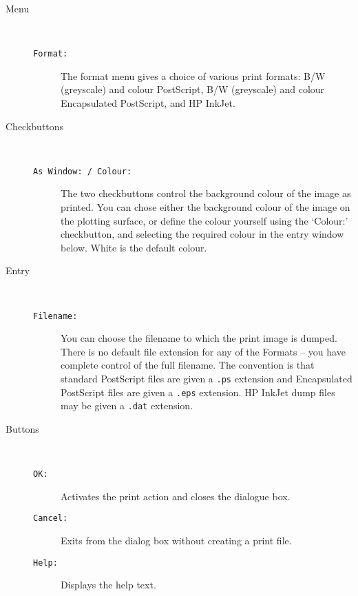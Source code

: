 \begin{description}

\item[Menu]~

\begin{description}

\item[{\tt{Format:}}] The format menu gives a choice of various print
formats: B/W (greyscale) and colour PostScript,  B/W (greyscale) and colour
Encapsulated PostScript, and HP InkJet.

\end{description}

\item[Checkbuttons]~

\begin{description}

\item[{\tt{As Window: / Colour:}}] The two checkbuttons control the
background colour of the image as printed.  You can chose either the
background colour of the image on the plotting surface, or define the
colour yourself using the `Colour:' checkbutton, and selecting the
required colour in the entry window below.  White is the default
colour.

\end{description}

\item[Entry]~

\begin{description}

\item[{\tt{Filename:}}] You can choose the filename to which the print
image is dumped.  There is no default file extension for any of the
Formats -- you have complete control of the full filename.  The
convention is that standard PostScript files are given a {\tt{.ps}}
extension and Encapsulated PostScript files are given a {\tt{.eps}}
extension.  HP InkJet dump files may be given a {\tt{.dat}} extension.

\end{description}

\item[Buttons]~

\begin{description}

\item[{\tt{OK:}}] Activates the print action and closes the {} dialogue box.

\item[{\tt{Cancel:}}] Exits from the {} dialog box
without creating a print file.

\item[{\tt{Help:}}] Displays the help text.

\end{description}

\end{description}

